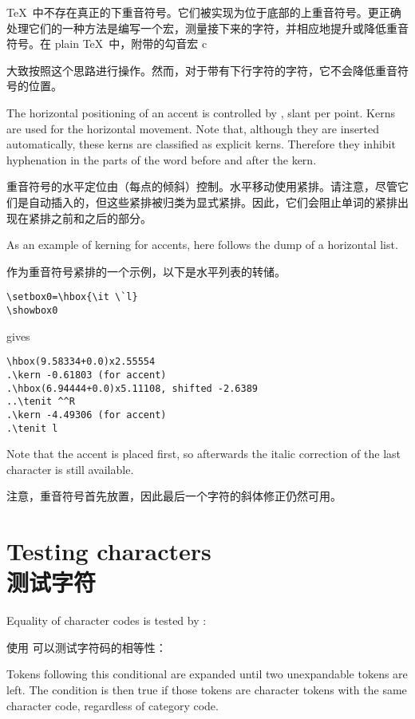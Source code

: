 \TeX\ 中不存在真正的下重音符号。它们被实现为位于底部的上重音符号。更正确处理它们的一种方法是编写一个宏，测量接下来的字符，并相应地提升或降低重音符号。在 plain \TeX\ 中，附带的勾音宏 \cstoidx c\par 大致按照这个思路进行操作。然而，对于带有下行字符的字符，它不会降低重音符号的位置。

The horizontal positioning of an accent is controlled by
, slant per point. Kerns are used
for the horizontal movement. Note that, although they
are inserted automatically, these kerns are classified
as {\italic explicit\/} kerns. Therefore they inhibit hyphenation
in the parts of the word before and after the kern.

重音符号的水平定位由（每点的倾斜）控制。水平移动使用紧排。请注意，尽管它们是自动插入的，但这些紧排被归类为{\italic 显式紧排}。因此，它们会阻止单词的紧排出现在紧排之前和之后的部分。


As an example of kerning for accents, 
here follows the dump of a horizontal list.

作为重音符号紧排的一个示例，以下是水平列表的转储。
\begin{verbatim}
\setbox0=\hbox{\it \`l}
\showbox0
\end{verbatim}
gives\begin{verbatim}
\hbox(9.58334+0.0)x2.55554
.\kern -0.61803 (for accent)
.\hbox(6.94444+0.0)x5.11108, shifted -2.6389
..\tenit ^^R
.\kern -4.49306 (for accent)
.\tenit l
\end{verbatim}
Note that the accent is placed first, so afterwards the italic
correction of the last character is still available.
\awp

注意，重音符号首先放置，因此最后一个字符的斜体修正仍然可用。


\section{Testing characters\\测试字符}

Equality of character codes is tested by :

使用  可以测试字符码的相等性：
\begin{disp}\end{disp}
Tokens following this conditional are expanded until two
unexpandable tokens are left. The condition is then true
if those tokens are character tokens with the same character
code, regardless of category code. 

